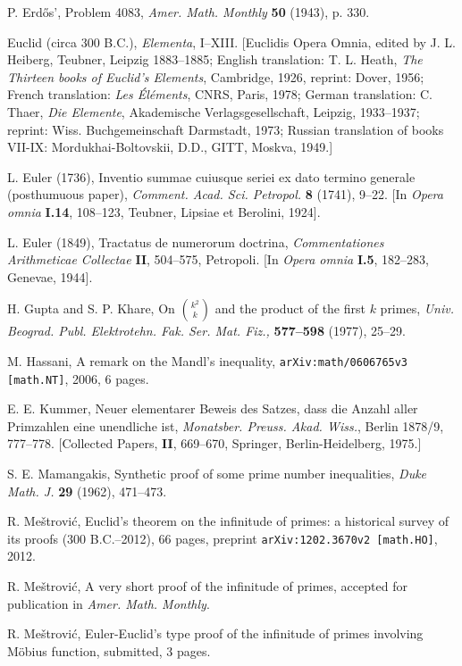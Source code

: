 \documentclass[12pt]{amsart}
\begin{document}
{\begin{thebibliography}{999}
 P. Erd\H{o}s', Problem 4083, {\it Amer. Math. Monthly}
{\bf 50} (1943), p. 330.

 Euclid (circa 300 {\small B.C.}), 
{\it Elementa}, I--XIII. [Euclidis Opera Omnia, edited by J. L. Heiberg, 
Teubner, Leipzig 1883--1885; English translation: T. L. Heath, 
{\it The Thirteen books of Euclid's Elements}, Cambridge, 1926, 
reprint: Dover, 1956; French translation: {\it Les \'{E}l\'{e}ments},
CNRS, Paris, 1978; German translation: C. Thaer, {\it Die Elemente},
Akademische Verlagsgesellschaft, Leipzig,
1933--1937; reprint: Wiss. Buchgemeinschaft Darmstadt, 1973;
Russian translation of books VII-IX: Mordukhai-Boltovskii, D.D., 
GITT, Moskva, 1949.]           

 L. Euler (1736), Inventio summae cuiusque seriei ex dato
termino generale (posthumuous paper),
{\it Comment. Acad. Sci. Petropol.} {\bf 8} (1741),  9--22.
[In {\it Opera omnia} {\bf I.14}, 108--123, Teubner, Lipsiae et Berolini, 
1924].

 L. Euler (1849), Tractatus de numerorum doctrina, 
{\it Commentationes Arithmeticae Collectae} {\bf II}, 504--575, Petropoli.
[In {\it Opera omnia} {\bf I.5}, 182--283, Genevae, 1944].

 H. Gupta and S. P. Khare, On ${k^2\choose k}$ and the product
of the first $k$ primes, {\it Univ. Beograd. Publ. Elektrotehn. Fak. Ser. 
Mat. Fiz.,} {\bf 577--598} (1977), 25--29.

 M. Hassani, A remark on the Mandl's inequality, 
{\tt arXiv:math/0606765v3 [math.NT]}, 2006, 6 pages. 

 E. E. Kummer, Neuer elementarer Beweis des Satzes,
dass die Anzahl aller Primzahlen eine unendliche ist,
{\it Monatsber. Preuss. Akad. Wiss.}, Berlin 1878/9, 777--778.
[Collected Papers, {\bf II}, 669--670, Springer, Berlin-Heidelberg, 1975.]

 S. E.  Mamangakis, Synthetic proof of some prime number 
inequalities, {\it Duke Math. J.} {\bf 29} (1962), 471--473.

 R. Me\v{s}trovi\'{c}, Euclid's theorem on the infinitude  of 
primes: a historical survey of its proofs (300 {\small B.C.}--2012), 
66 pages, preprint {\tt arXiv:1202.3670v2 [math.HO]}, 2012.

 R. Me\v{s}trovi\'{c}, A very short proof of the infinitude of 
primes, accepted for publication in {\it Amer. Math. Monthly}.

 R. Me\v{s}trovi\'{c},
Euler-Euclid's type proof of the infinitude of primes involving M\"{o}bius 
function, submitted, 3 pages.


\end{thebibliography}}
\end{document}
